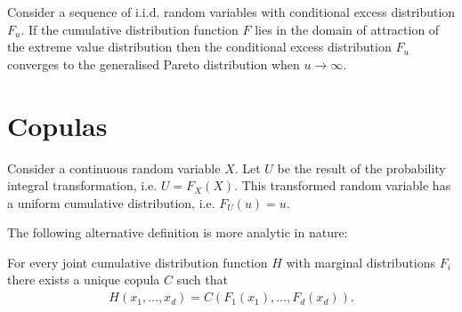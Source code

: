     \begin{theorem}
        Consider a sequence of i.i.d. random variables with conditional excess distribution $F_u$. If the cumulative distribution function $F$ lies in the domain of attraction of the extreme value distribution then the conditional excess distribution $F_u$ converges to the generalised Pareto distribution when $u\longrightarrow\infty$.
    \end{theorem}

\section{Copulas}

    \begin{property}
        Consider a continuous random variable $X$. Let $U$ be the result of the probability integral transformation, i.e. $U = F_X(X)$. This transformed random variable has a uniform cumulative distribution, i.e. $F_U(u) = u$.
    \end{property}


    The following alternative definition is more analytic in nature:

    \begin{theorem}[Sklar]
        For every joint cumulative distribution function $H$ with marginal distributions $F_i$ there exists a unique copula $C$ such that
        \begin{gather}
        H(x_1, \ldots, x_d) = C(F_1(x_1), \ldots, F_d(x_d)).
        \end{gather}
    \end{theorem}

